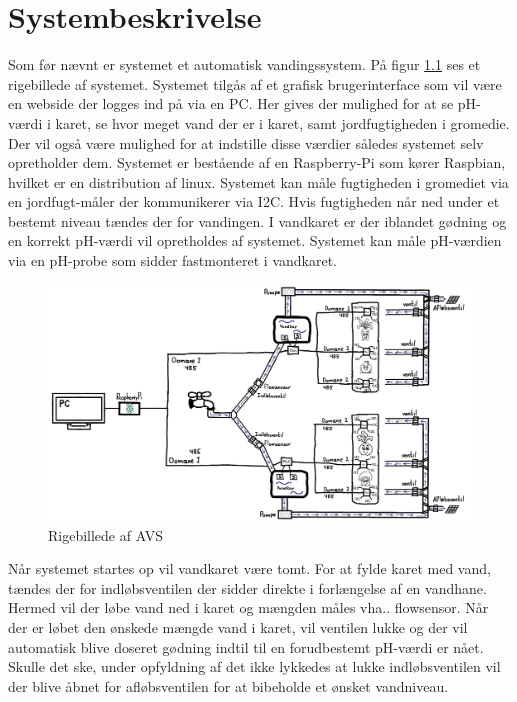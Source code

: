 \chapter{Systembeskrivelse}
Som før nævnt er systemet et automatisk vandingssystem. På figur \ref{photo:RigeBillede} ses et rigebillede af systemet. Systemet tilgås af et grafisk brugerinterface som vil være en webside der logges ind på via en PC. Her gives der mulighed for at se pH-værdi i karet, se hvor meget vand der er i karet, samt jordfugtigheden i gromedie. Der vil også være mulighed for at indstille disse værdier således systemet selv opretholder dem. Systemet er bestående af en  Raspberry-Pi som kører Raspbian, hvilket er en distribution af linux. Systemet kan måle fugtigheden i gromediet via en jordfugt-måler der kommunikerer via I2C.\newline 
Hvis fugtigheden når ned under et bestemt niveau tændes der for vandingen. I vandkaret er der iblandet gødning og en korrekt pH-værdi vil opretholdes af systemet. Systemet kan måle pH-værdien via en pH-probe som sidder fastmonteret i vandkaret.
 
\begin{figure}[H]
	\centering
	\includegraphics[scale=0.45]{systembeskrivelse/rigebillede}
	\caption{Rigebillede af AVS}
	\label{photo:RigeBillede}
\end{figure}

Når systemet startes op vil vandkaret være tomt. For at fylde karet med vand, tændes der for indløbsventilen der sidder direkte i forlængelse af en vandhane. Hermed vil der løbe vand ned i karet og mængden måles vha.. flowsensor. Når der er løbet den ønskede mængde vand i karet, vil ventilen lukke og der vil automatisk blive doseret gødning indtil til en forudbestemt pH-værdi er nået. Skulle det ske, under opfyldning af det ikke lykkedes at lukke indløbsventilen vil der blive åbnet for afløbsventilen for at bibeholde et ønsket vandniveau.

